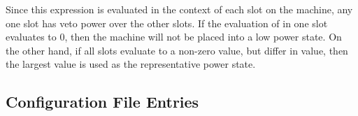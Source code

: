 \begin{description}
  Since this expression is evaluated in the context of each slot on the
  machine, any one slot has veto power over the other slots.  If the 
  evaluation of  in one slot evaluates to 0, then
  the machine will not be placed into a low power state.  On the other
  hand, if all slots evaluate to a non-zero value, but differ in value, 
  then the largest value is used as the representative power state.

\end{description}

\subsection{\label{sec:Schedd-Config-File-Entries}
Configuration File Entries}

